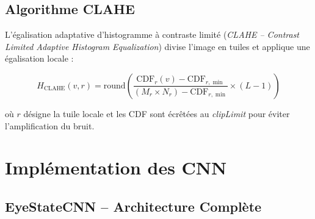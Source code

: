 \documentclass[12pt,a4paper,twoside]{report}
\begin{document}
\subsection{Algorithme CLAHE}

L'égalisation adaptative d'histogramme à contraste limité (\textit{CLAHE -- Contrast Limited Adaptive Histogram Equalization}) divise l'image en tuiles et applique une égalisation locale :

\begin{equation}
H_{\text{CLAHE}}(v, r) = \text{round}\left(\frac{\text{CDF}_r(v) - \text{CDF}_{r,\min}}{(M_r \times N_r) - \text{CDF}_{r,\min}} \times (L - 1)\right)
\label{eq:clahe}
\end{equation}

où $r$ désigne la tuile locale et les CDF sont écrêtées au \textit{clipLimit} pour éviter l'amplification du bruit.

\section{Implémentation des CNN}

\subsection{EyeStateCNN -- Architecture Complète}
\end{document}
